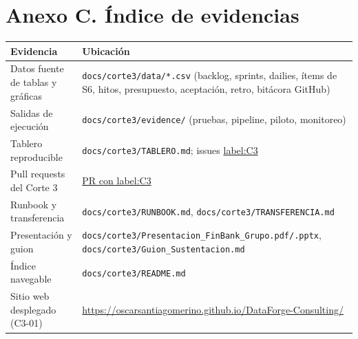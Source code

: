 \documentclass[10pt,a4paper]{article}
\begin{document}
\section*{Anexo C. Índice de evidencias}
\small
\begin{tabularx}{\linewidth}{l X}
\toprule
\textbf{Evidencia} & \textbf{Ubicación} \\
\midrule
Datos fuente de tablas y gráficas & \texttt{docs/corte3/data/*.csv} (backlog, sprints, dailies, ítems de S6, hitos, presupuesto, aceptación, retro, bitácora GitHub) \\
Salidas de ejecución & \texttt{docs/corte3/evidence/} (pruebas, pipeline, piloto, monitoreo) \\
Tablero reproducible & \texttt{docs/corte3/TABLERO.md}; issues \href{https://github.com/OscarSantiagoMerino/DataForge-Consulting/issues?q=label\%3AC3}{label:C3} \\
Pull requests del Corte 3 & \href{https://github.com/OscarSantiagoMerino/DataForge-Consulting/pulls?q=label\%3AC3}{PR con label:C3} \\
Runbook y transferencia & \texttt{docs/corte3/RUNBOOK.md}, \texttt{docs/corte3/TRANSFERENCIA.md} \\
Presentación y guion & \texttt{docs/corte3/Presentacion\_FinBank\_Grupo\Grupo{}.pdf/.pptx}, \texttt{docs/corte3/Guion\_Sustentacion.md} \\
Índice navegable & \texttt{docs/corte3/README.md} \\
Sitio web desplegado (C3-01) & \url{https://oscarsantiagomerino.github.io/DataForge-Consulting/} \\
\bottomrule
\end{tabularx}
\end{document}
